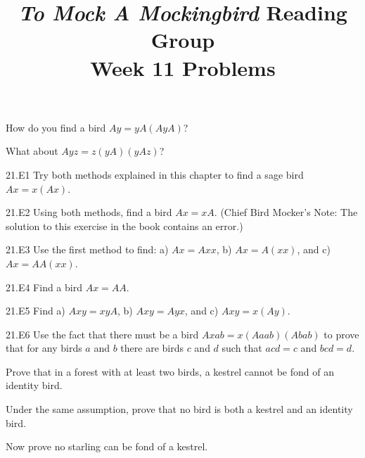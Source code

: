 \documentclass[12pt, letterpaper]{article}
\title{\emph{To Mock A Mockingbird} Reading Group\\Week 11 Problems}
\begin{document}
\maketitle

\disclaimer

\begin{prob}{21.1}  
How do you find a bird $Ay = yA(AyA)$?
\end{prob}

\begin{prob}{21.2}  
What about $Ayz = z(yA)(yAz)$?
\end{prob}

\begin{prob}{21.E1} 
Try both methods explained in this chapter to find a sage bird $Ax = x(Ax)$.
\end{prob}

\begin{prob}{21.E2} 
Using both methods, find a bird $Ax = xA$. (Chief Bird Mocker's Note: The solution to this exercise in the book contains an error.)
\end{prob}

\begin{prob}{21.E3} 
Use the first method to find: a) $Ax = Axx$, b) $Ax = A(xx)$, and c) $Ax = AA(xx)$.
\end{prob}

\begin{prob}{21.E4} 
Find a bird $Ax = AA$.
\end{prob}

\begin{prob}{21.E5} 
Find a) $Axy = xyA$, b) $Axy = Ayx$, and c) $Axy = x(Ay)$.
\end{prob}

\begin{prob}{21.E6} 
Use the fact that there must be a bird $Axab = x(Aaab)(Abab)$ to prove that for any birds $a$ and $b$ there are birds $c$ and $d$ such that $acd = c$ and $bcd = d$.
\end{prob}

\begin{prob}{22.1}  
Prove that in a forest with at least two birds, a kestrel cannot be fond of an identity bird.
\end{prob}

\begin{prob}{22.2}  
Under the same assumption, prove that no bird is both a kestrel and an identity bird.
\end{prob}

\begin{prob}{22.3}  
Now prove no starling can be fond of a kestrel.
\end{prob}
\end{document}
